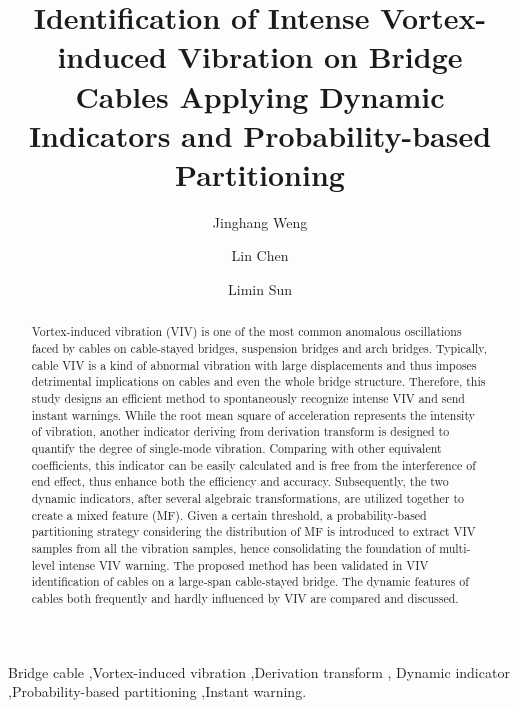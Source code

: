 \documentclass[preprint, 3p, times, compress, 11pt]{elsarticle}
\begin{document}
\begin{frontmatter}
\title{Identification of Intense Vortex-induced Vibration on Bridge Cables 
        Applying Dynamic Indicators and Probability-based Partitioning}
\author[tongji]{Jinghang Weng}
\author[tongji]{Lin Chen}
\author[tongji,lab,qizhi]{Limin Sun}
\address[tongji]{Department of Bridge Engineering, Tongji University, 
    Shanghai 200092, China}
\address[lab]{State Key Laboratory of Disaster Reduction of Civil 
    Engineering, Tongji University, Shanghai 200092, China}
\address[qizhi]{Shanghai Qi Zhi Institute, Shanghai 200092, China}

\begin{abstract}
Vortex-induced vibration (VIV) is one of the most common anomalous 
oscillations faced by cables on cable-stayed bridges, suspension bridges
and arch bridges. Typically, cable VIV is a kind of abnormal vibration 
with large displacements and thus imposes detrimental implications 
on cables and even the whole bridge structure. Therefore, this study 
designs an efficient method to spontaneously recognize intense VIV 
and send instant warnings. While the root mean square of acceleration 
represents the intensity of vibration, another indicator deriving from 
derivation transform is designed to quantify the degree of single-mode 
vibration. Comparing with other equivalent coefficients, this indicator 
can be easily calculated and is free from the interference of end effect, 
thus enhance both the efficiency and accuracy. Subsequently, the two 
dynamic indicators, after several algebraic transformations, are utilized 
together to create a mixed feature (MF). Given a certain threshold, a 
probability-based partitioning strategy considering the distribution 
of MF is introduced to extract VIV samples from all the vibration samples, 
hence consolidating the foundation of multi-level intense VIV warning. 
The proposed method has been validated in VIV identification of cables on 
a large-span cable-stayed bridge. The dynamic features of cables both
frequently and hardly influenced by VIV are compared and discussed. 
\end{abstract}

\begin{keyword}
Bridge cable \sep Vortex-induced vibration \sep Derivation transform \sep 
Dynamic indicator \sep Probability-based partitioning \sep Instant warning. 
\end{keyword}
\end{frontmatter}
\end{document}
